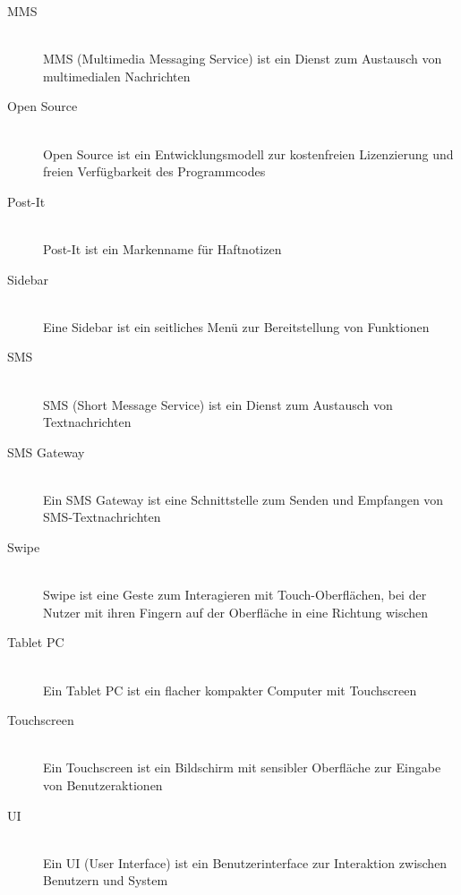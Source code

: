 \begin{description}
  \item[MMS] \hfill \\
    MMS (Multimedia Messaging Service) ist ein Dienst zum Austausch von multimedialen Nachrichten
  \item[Open Source] \hfill \\
    Open Source ist ein Entwicklungsmodell zur kostenfreien Lizenzierung und freien Verfügbarkeit des Programmcodes
  \item[Post-It] \hfill \\
    Post-It ist ein Markenname für Haftnotizen
  \item[Sidebar] \hfill \\
    Eine Sidebar ist ein seitliches Menü zur Bereitstellung von Funktionen
  \item[SMS] \hfill \\
    SMS (Short Message Service) ist ein Dienst zum Austausch von Textnachrichten
  \item[SMS Gateway] \hfill \\
    Ein SMS Gateway ist eine Schnittstelle zum Senden und Empfangen von SMS-Textnachrichten
  \item[Swipe] \hfill \\
    Swipe ist eine Geste zum Interagieren mit Touch-Oberflächen, bei der Nutzer mit ihren Fingern auf der Oberfläche in eine Richtung wischen
  \item[Tablet PC] \hfill \\
    Ein Tablet PC ist ein flacher kompakter Computer mit Touchscreen
  \item[Touchscreen] \hfill \\
    Ein Touchscreen ist ein Bildschirm mit sensibler Oberfläche zur Eingabe von Benutzeraktionen
  \item[UI] \hfill \\
    Ein UI (User Interface) ist ein Benutzerinterface zur Interaktion zwischen Benutzern und System
\end{description}

